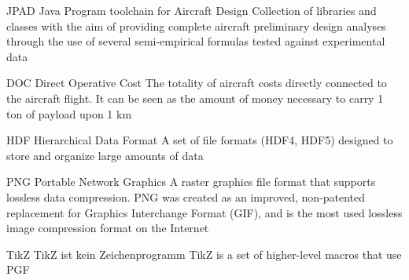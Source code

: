 %
%



  {JPAD}            %
  {Java Program toolchain for Aircraft Design}  %
  {Collection of libraries and classes with the aim of providing complete aircraft preliminary design analyses through the use of several semi-empirical formulas tested against experimental data} %


%
  {DOC}            %
  {Direct Operative Cost}  %
  {The totality of aircraft costs directly connected to the aircraft flight. It can be seen as the amount of money necessary to carry 1 ton of payload upon 1 km}

%
  {HDF}            %
  {Hierarchical Data Format}  %
  {A set of file formats (HDF4, HDF5) designed to store and organize large amounts of data}
  
  {PNG}            %
  {Portable Network Graphics}  %
  {A raster graphics file format that supports lossless data compression. PNG was created as an improved, non-patented replacement for Graphics Interchange Format (GIF), and is the most used lossless image compression format on the Internet} %
  
  {TikZ}            %
  {TikZ ist kein Zeichenprogramm}  %
  {TikZ is a set of higher-level macros that use PGF} %



